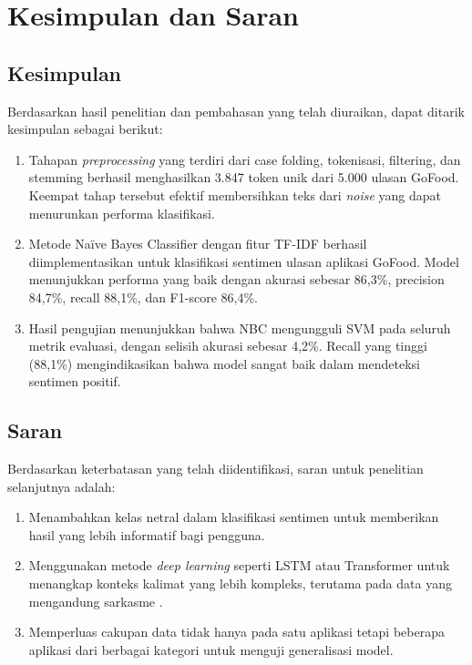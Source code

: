 \chapter{Kesimpulan dan Saran}

\section{Kesimpulan}

Berdasarkan hasil penelitian dan pembahasan yang telah diuraikan, dapat ditarik kesimpulan sebagai berikut:

\begin{enumerate}
  \item Tahapan \emph{preprocessing} yang terdiri dari case folding, tokenisasi, filtering, dan stemming berhasil menghasilkan 3.847 token unik dari 5.000 ulasan GoFood. Keempat tahap tersebut efektif membersihkan teks dari \emph{noise} yang dapat menurunkan performa klasifikasi.
  \item Metode Na\"ive Bayes Classifier dengan fitur TF-IDF berhasil diimplementasikan untuk klasifikasi sentimen ulasan aplikasi GoFood. Model menunjukkan performa yang baik dengan akurasi sebesar 86,3\%, precision 84,7\%, recall 88,1\%, dan F1-score 86,4\%.
  \item Hasil pengujian menunjukkan bahwa NBC mengungguli SVM pada seluruh metrik evaluasi, dengan selisih akurasi sebesar 4,2\%. Recall yang tinggi (88,1\%) mengindikasikan bahwa model sangat baik dalam mendeteksi sentimen positif.
\end{enumerate}

\section{Saran}

Berdasarkan keterbatasan yang telah diidentifikasi, saran untuk penelitian selanjutnya adalah:

\begin{enumerate}
  \item Menambahkan kelas netral dalam klasifikasi sentimen untuk memberikan hasil yang lebih informatif bagi pengguna.
  \item Menggunakan metode \emph{deep learning} seperti LSTM atau Transformer untuk menangkap konteks kalimat yang lebih kompleks, terutama pada data yang mengandung sarkasme \cite{zhang2020}.
  \item Memperluas cakupan data tidak hanya pada satu aplikasi tetapi beberapa aplikasi dari berbagai kategori untuk menguji generalisasi model.
\end{enumerate}
